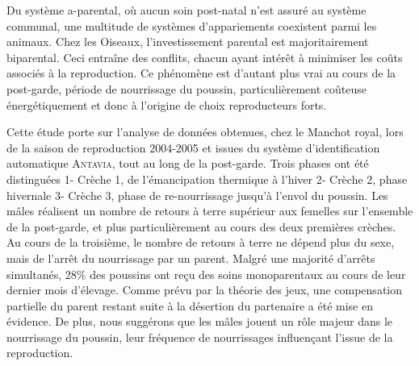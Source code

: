 \begin{singlespace}
Du système a-parental, où aucun soin post-natal n'est assuré au système communal, une multitude de systèmes d'appariements coexistent parmi les animaux. Chez les Oiseaux, l'investissement parental est majoritairement biparental. Ceci entraîne des conflits, chacun ayant intérêt à minimiser les coûts associés à la reproduction. Ce phénomène est d'autant plus vrai au cours de la post-garde, période de nourrissage du poussin, particulièrement coûteuse énergétiquement et donc à l'origine de choix reproducteurs forts. 

Cette étude porte sur l'analyse de données obtenues, chez le Manchot royal, lors de la saison de reproduction 2004-2005 et issues du système d'identification automatique \textsc{Antavia}, tout au long de la post-garde. Trois phases ont été distinguées 1- Crèche 1, de l'émancipation thermique à l'hiver 2- Crèche 2, phase hivernale 3- Crèche 3, phase de re-nourrissage jusqu'à l'envol du poussin. Les mâles réalisent un nombre de retours à terre supérieur aux femelles sur l'ensemble de la post-garde, et plus particulièrement au cours des deux premières crèches. Au cours de la troisième, le nombre de retours à terre ne dépend plus du sexe, mais de l'arrêt du nourrissage par un parent. Malgré une majorité d'arrêts simultanés, 28\% des poussins ont reçu des soins monoparentaux au cours de leur dernier mois d'élevage. Comme prévu par la théorie des jeux, une compensation partielle du parent restant suite à la désertion du partenaire a été mise en évidence. De plus, nous suggérons que les mâles jouent un rôle majeur dans le nourrissage du poussin, leur fréquence de nourrissages influençant l'issue de la reproduction.

\end{singlespace}